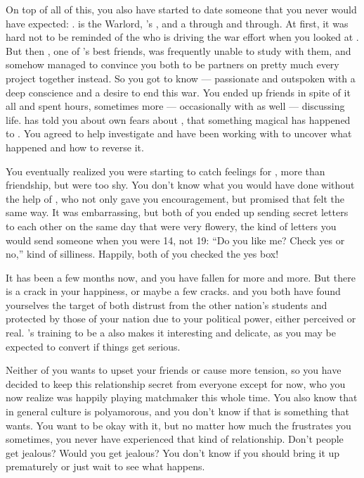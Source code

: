 \documentclass[char]{GL2020}
\begin{document}
On top of all of this, you also have started to date someone that you never would have expected: \cWarlordDaughter{\full}. \cWarlordDaughter{} is the \pShippie{} Warlord, \cLoud{\full}'s \cWarlordDaughter{\offspring}, and a \pShippie{} through and through. At first, it was hard not to be reminded of the \cLoud{\person} who is driving the war effort when you looked at \cWarlordDaughter{\them}. But then \cInitiate{\full}, one of \cWarlordDaughter{}’s best friends, was frequently unable to study with them, and somehow managed to convince you both to be partners on pretty much every project together instead. So you got to know \cWarlordDaughter{} — passionate and outspoken with a deep conscience and a desire to end this war. You ended up friends in spite of it all and spent hours, sometimes more — occasionally with \cScholarship{} as well — discussing life.  \cWarlordDaughter{} has told you about \cWarlordDaughter{\their} own fears about \cWarlordDaughter{\their} \cLoud{\parent}, that something magical has happened to \cLoud{\them}. You agreed to help investigate and have been working with \cWarlordDaughter{\them} to uncover what happened and how to reverse it. 

You eventually realized you were starting to catch feelings for \cWarlordDaughter{}, more than friendship, but were too shy. You don’t know what you would have done without the help of \cInitiate{\full}, who not only gave you encouragement, but promised that \cWarlordDaughter{} felt the same way. It was embarrassing, but both of you ended up sending secret letters to each other on the same day that were very flowery, the kind of letters you would send someone when you were 14, not 19: ``Do you like me? Check yes or no,” kind of silliness. Happily, both of you checked the yes box!

It has been a few months now, and you have fallen for \cWarlordDaughter{} more and more. But there is a crack in your happiness, or maybe a few cracks. \cWarlordDaughter{} and you both have found yourselves the target of both distrust from the other nation’s students and protected by those of your nation due to your political power, either perceived or real.  \cWarlordDaughter{}’s training to be a \cWarlordDaughter{\cleric} also makes it interesting and delicate, as you may be expected to convert if things get serious. 

Neither of you wants to upset your friends or cause more tension, so you have decided to keep this relationship secret from everyone except \cInitiate{} for now, who you now realize was happily playing matchmaker this whole time. You also know that in general \pShippie{} culture is polyamorous, and you don’t know if that is something that \cWarlordDaughter{} wants. You want to be okay with it, but no matter how much the \pTech{} frustrates you sometimes, you never have experienced that kind of relationship. Don’t people get jealous? Would you get jealous? You don’t know if you should bring it up prematurely or just wait to see what happens.  
\end{document}

